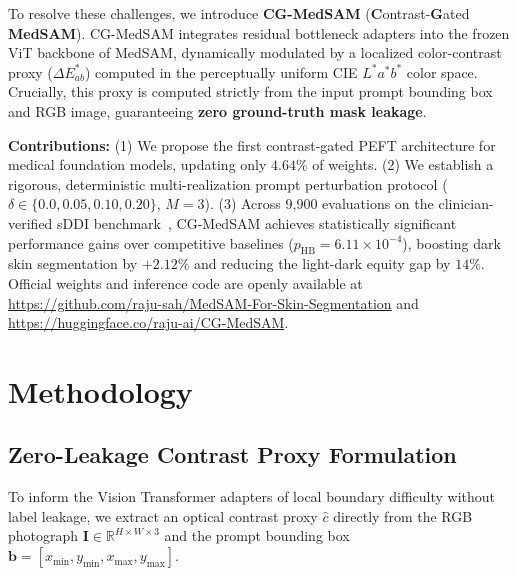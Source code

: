 \documentclass[runningheads]{llncs}
\begin{document}
To resolve these challenges, we introduce \textbf{CG-MedSAM} (\textbf{C}ontrast-\textbf{G}ated \textbf{MedSAM}). CG-MedSAM integrates residual bottleneck adapters into the frozen ViT backbone of MedSAM, dynamically modulated by a localized color-contrast proxy ($\Delta E^*_{ab}$) computed in the perceptually uniform CIE $L^*a^*b^*$ color space. Crucially, this proxy is computed strictly from the input prompt bounding box and RGB image, guaranteeing \textbf{zero ground-truth mask leakage}.

\textbf{Contributions:} (1) We propose the first contrast-gated PEFT architecture for medical foundation models, updating only $4.64\%$ of weights. (2) We establish a rigorous, deterministic multi-realization prompt perturbation protocol ($\delta \in \{0.0, 0.05, 0.10, 0.20\}$, $M=3$). (3) Across 9,900 evaluations on the clinician-verified sDDI benchmark~\cite{carrion2023fedd}, CG-MedSAM achieves statistically significant performance gains over competitive baselines ($p_{\text{HB}} = 6.11 \times 10^{-4}$), boosting dark skin segmentation by $+2.12\%$ and reducing the light-dark equity gap by $14\%$. Official weights and inference code are openly available at \url{https://github.com/raju-sah/MedSAM-For-Skin-Segmentation} and \url{https://huggingface.co/raju-ai/CG-MedSAM}.

\section{Methodology}

\subsection{Zero-Leakage Contrast Proxy Formulation}
To inform the Vision Transformer adapters of local boundary difficulty without label leakage, we extract an optical contrast proxy $\hat{c}$ directly from the RGB photograph $\mathbf{I} \in \mathbb{R}^{H \times W \times 3}$ and the prompt bounding box $\mathbf{b} = [x_{\min}, y_{\min}, x_{\max}, y_{\max}]$.
\end{document}
